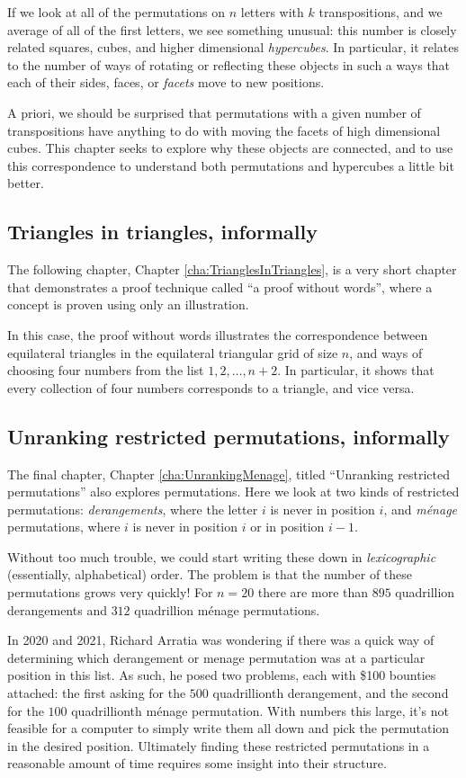 If we look at all of the permutations on $n$ letters with $k$ transpositions,
and we average of all of the first letters, we see
something unusual: this number is closely related
squares, cubes, and higher dimensional \textit{hypercubes}.
In particular, it relates to the number of ways of rotating or reflecting
these objects in such a ways that each of their sides, faces, or \textit{facets}
move to new positions.

A priori, we should be surprised that permutations with a given number of
transpositions have anything to do with moving the facets of high dimensional
cubes. This chapter seeks to explore why these objects are connected, and
to use this correspondence to understand both permutations and hypercubes a
little bit better.

\subsection{Triangles in triangles, informally}
The following chapter, Chapter \ref{cha:TrianglesInTriangles}, is a very short
chapter that demonstrates a proof technique called ``a proof without words'',
where a concept is proven using only an illustration.

In this case, the proof without words illustrates the correspondence between
equilateral triangles in the equilateral triangular grid of size $n$, and
ways of choosing four numbers from the list $1, 2, \dots, n+2$. In particular,
it shows that every collection of four numbers corresponds to a triangle, and
vice versa.

\subsection{Unranking restricted permutations, informally}
The final chapter, Chapter \ref{cha:UnrankingMenage},
titled ``Unranking restricted permutations''
also explores permutations.
Here we look at
two kinds of restricted permutations: \textit{derangements}, where the letter $i$ is never
in position $i$, and \textit{m\'enage} permutations, where $i$ is never in
position $i$ or in position $i - 1$.

Without too much trouble, we could start writing these down in
\textit{lexicographic} (essentially, alphabetical) order. The
problem is that the number of these permutations grows very quickly! For
$n=20$ there are more than $895$ quadrillion derangements and
$312$ quadrillion m\'enage permutations.

In 2020 and 2021, Richard Arratia
was wondering if there was a quick way of determining which derangement or
menage permutation was at a particular position in this list.
As such, he posed two problems, each with \$100 bounties attached:
the first asking for the $500$ quadrillionth derangement, and
the second for the $100$ quadrillionth m\'enage permutation.
With numbers this large, it's not feasible for a computer to simply
write them all down and pick the permutation in the desired position.
Ultimately finding these restricted permutations in a reasonable amount of time
requires some insight into their structure.

